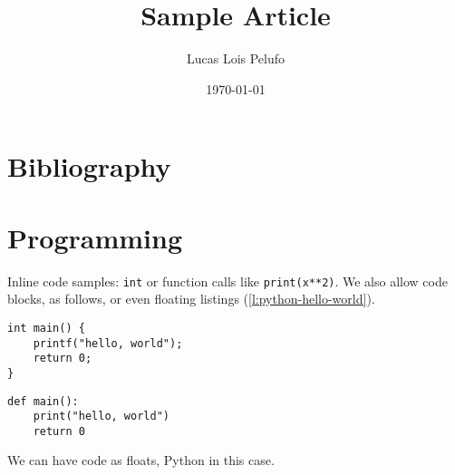 \documentclass{baseline}
\title{Sample Article}
\author{Lucas Lois Pelufo}
\date{\today}
\begin{document}
\maketitle

\tableofcontents

\section{Bibliography}

\blindtext \cite{coulouris,paxos}

\section{Programming}

Inline code samples: \texttt{int} or function calls like \texttt{print(x**2)}.
We also allow code blocks, as follows, or even floating listings (\ref{l:python-hello-world}).

\begin{verbatim}
int main() {
    printf("hello, world");
    return 0;
}
\end{verbatim}

\begin{listing}
\begin{verbatim}
def main():
    print("hello, world")
    return 0
\end{verbatim}
\caption{We can have code as floats, Python in this case.}
\label{l:python-hello-world}
\end{listing}

\Blinddocument

\pagebreak

\printbibliography{}
\end{document}

